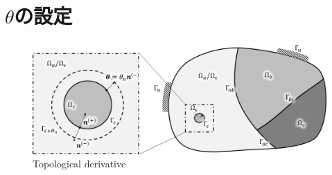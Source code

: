 \section{$\theta$の設定}

\begin{figure}[ht]
	\begin{center}
		\includegraphics[width=13cm]{./figures/SDforTD.png}
		\caption{Topological derivative}
		\label{fig:TD}
	\end{center}
\end{figure}

